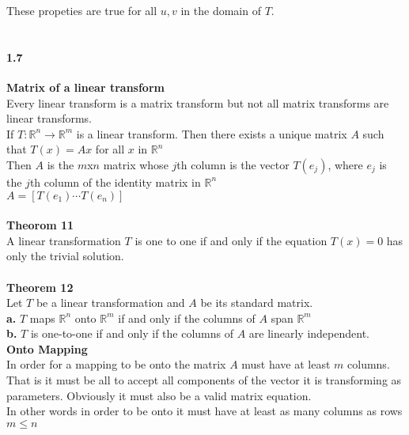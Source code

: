 \documentclass[14pt]{extreport}
\begin{document}
These propeties are true for all $u, v$ in the domain of $T$.\\\\


\paragraph{1.7}\textbf{Matrix of a linear transform}\\

Every linear transform is a matrix transform but not all matrix transforms are linear transforms.\\

If $T: \mathbb{R}^n \to \mathbb{R}^m$ is a linear transform. Then there exists a unique matrix $A$ such that $T(x) = Ax$ for all $x$ in $\mathbb{R}^n$\\

Then $A$ is the $m$x$n$ matrix whose $j$th column is the vector $T(e_j)$, where $e_j$ is the $j$th column of the identity matrix in $\mathbb{R}^n$\\

$A = [ T(e_1) \cdots T(e_n) ]$\\\\

\textbf{Theorom 11}\\
A linear transformation $T$ is one to one if and only if the equation $T(x)=0$ has only the trivial solution.\\\\


\textbf{Theorem 12}\\
Let $T$ be a linear transformation and $A$ be its standard matrix.\\
\textbf{a.} $T$ maps $\mathbb{R}^n$ onto $\mathbb{R}^m$ if and only if the columns of $A$ span $\mathbb{R}^m$\\

\textbf{b.} $T$ is one-to-one if and only if the columns of $A$ are linearly independent.\\


\textbf{Onto Mapping}\\

In order for a mapping to be onto the matrix $A$ must have at least $m$ columns. That is it must be all to accept all components of the vector it is transforming as parameters. Obviously it must also be a valid matrix equation.\\

In other words in order to be onto it must have at least as many columns as rows $m \le n$\\\\
\end{document}
